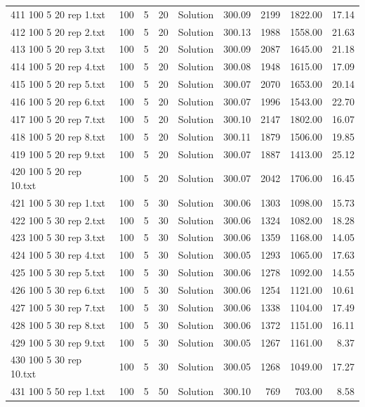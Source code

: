 \begin{longtable}{lrrllrrrr}
411 100 5 20 rep 1.txt & 100 & 5 & 20 & Solution & 300.09 & 2199 & 1822.00 & 17.14\\
412 100 5 20 rep 2.txt & 100 & 5 & 20 & Solution & 300.13 & 1988 & 1558.00 & 21.63\\
413 100 5 20 rep 3.txt & 100 & 5 & 20 & Solution & 300.09 & 2087 & 1645.00 & 21.18\\
414 100 5 20 rep 4.txt & 100 & 5 & 20 & Solution & 300.08 & 1948 & 1615.00 & 17.09\\
415 100 5 20 rep 5.txt & 100 & 5 & 20 & Solution & 300.07 & 2070 & 1653.00 & 20.14\\
416 100 5 20 rep 6.txt & 100 & 5 & 20 & Solution & 300.07 & 1996 & 1543.00 & 22.70\\
417 100 5 20 rep 7.txt & 100 & 5 & 20 & Solution & 300.10 & 2147 & 1802.00 & 16.07\\
418 100 5 20 rep 8.txt & 100 & 5 & 20 & Solution & 300.11 & 1879 & 1506.00 & 19.85\\
419 100 5 20 rep 9.txt & 100 & 5 & 20 & Solution & 300.07 & 1887 & 1413.00 & 25.12\\
420 100 5 20 rep 10.txt & 100 & 5 & 20 & Solution & 300.07 & 2042 & 1706.00 & 16.45\\
421 100 5 30 rep 1.txt & 100 & 5 & 30 & Solution & 300.06 & 1303 & 1098.00 & 15.73\\
422 100 5 30 rep 2.txt & 100 & 5 & 30 & Solution & 300.06 & 1324 & 1082.00 & 18.28\\
423 100 5 30 rep 3.txt & 100 & 5 & 30 & Solution & 300.06 & 1359 & 1168.00 & 14.05\\
424 100 5 30 rep 4.txt & 100 & 5 & 30 & Solution & 300.05 & 1293 & 1065.00 & 17.63\\
425 100 5 30 rep 5.txt & 100 & 5 & 30 & Solution & 300.06 & 1278 & 1092.00 & 14.55\\
426 100 5 30 rep 6.txt & 100 & 5 & 30 & Solution & 300.06 & 1254 & 1121.00 & 10.61\\
427 100 5 30 rep 7.txt & 100 & 5 & 30 & Solution & 300.06 & 1338 & 1104.00 & 17.49\\
428 100 5 30 rep 8.txt & 100 & 5 & 30 & Solution & 300.06 & 1372 & 1151.00 & 16.11\\
429 100 5 30 rep 9.txt & 100 & 5 & 30 & Solution & 300.05 & 1267 & 1161.00 &  8.37\\
430 100 5 30 rep 10.txt & 100 & 5 & 30 & Solution & 300.05 & 1268 & 1049.00 & 17.27\\
431 100 5 50 rep 1.txt & 100 & 5 & 50 & Solution & 300.10 & 769 & 703.00 &  8.58\\

\end{longtable}
